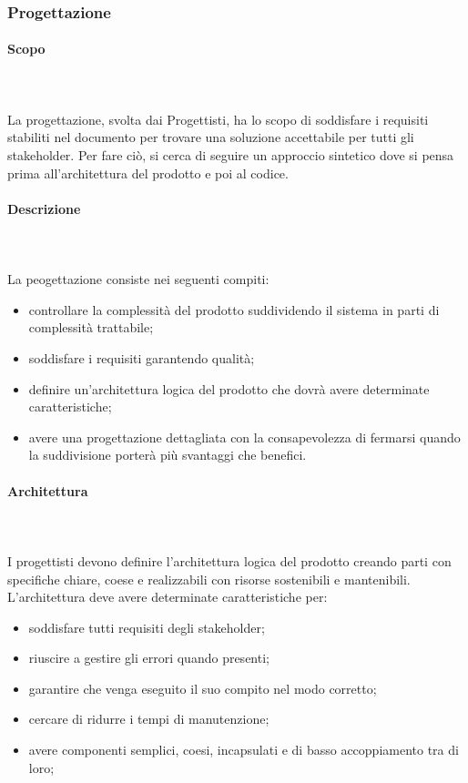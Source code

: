 \subsubsection{Progettazione}
\paragraph{Scopo}\mbox{}\\ \\
La progettazione, svolta dai Progettisti, ha lo scopo di soddisfare i requisiti stabiliti nel documento \AdR{} per trovare una soluzione accettabile per tutti gli stakeholder.
Per fare ciò, si cerca di seguire un approccio sintetico dove si pensa prima all’architettura del prodotto e poi al codice.
\paragraph{Descrizione}\mbox{}\\ \\
La peogettazione consiste nei seguenti compiti:
\begin{itemize}
	\item controllare la complessità del prodotto suddividendo il sistema in parti di complessità trattabile;
	\item soddisfare i requisiti garantendo qualità;
	\item definire un’architettura logica del prodotto che dovrà avere determinate caratteristiche;
	\item avere una progettazione dettagliata con la consapevolezza di fermarsi quando la suddivisione porterà più svantaggi che benefici.
\end{itemize}

\paragraph{Architettura}\mbox{}\\ \\
I progettisti devono definire l’architettura logica del prodotto creando parti con specifiche chiare, coese e realizzabili con risorse sostenibili e mantenibili. L'architettura deve avere determinate caratteristiche per:
\begin{itemize}
	\item soddisfare tutti requisiti degli stakeholder;
	\item riuscire a gestire gli errori quando presenti;
	\item garantire che venga eseguito il suo compito nel modo corretto;
	\item cercare di ridurre i tempi di manutenzione;
	\item avere componenti semplici, coesi, incapsulati e di basso accoppiamento tra di loro;
\end{itemize}

